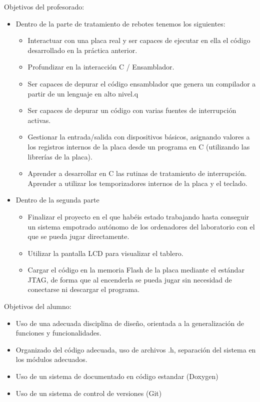 \documentclass[12pt,letterpaper]{article}
\begin{document}
Objetivos del profesorado:
\begin{itemize}
  \item Dentro de la parte de tratamiento de rebotes tenemos los siguientes:
    \begin{itemize}
      \item Interactuar con una placa real y ser capaces de ejecutar
        en ella el código desarrollado en la práctica anterior.
      \item Profundizar en la interacción C / Ensamblador.
      \item Ser capaces de depurar el código ensamblador que genera un
        compilador a partir de un lenguaje en alto nivel.q
      \item Ser capaces de depurar un código con varias fuentes de interrupción activas.
      \item Gestionar la entrada/salida con dispositivos básicos, asignando
        valores a los registros internos de la placa desde un programa en C
        (utilizando las librerías de la placa).
      \item Aprender a desarrollar en C las rutinas de tratamiento de
        interrupción.  Aprender a utilizar los temporizadores internos de la
        placa y el teclado.
    \end{itemize}
  \item Dentro de la segunda parte
    \begin{itemize}
      \item Finalizar el proyecto en el que habéis estado trabajando
        hasta conseguir un sistema empotrado autónomo de los
        ordenadores del laboratorio con el que se pueda jugar
        directamente.
      \item Utilizar la pantalla LCD para visualizar el tablero.
      \item Cargar el código en la memoria Flash de la placa mediante
        el estándar JTAG, de forma que al encenderla se pueda jugar
        sin necesidad de conectarse ni descargar el programa.
    \end{itemize}
\end{itemize}

Objetivos del alumno:
\begin{itemize}
  \item Uso de una adecuada disciplina de diseño, orientada a la
    generalización de funciones y funcionalidades.
  \item Organizado del código adecuada, uso de archivos .h, separación
    del sistema en los módulos adecuados.
  \item Uso de un sistema de documentado en código estandar (Doxygen)
  \item Uso de un sistema de control de versiones (Git)
\end{itemize}
\end{document}
